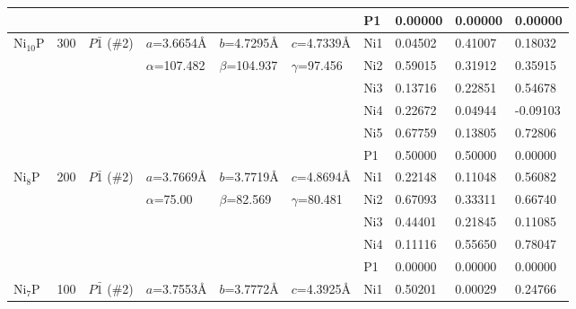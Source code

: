 \documentclass[twoside,twocolumn,9pt]{article}
\begin{document}
\begin{table}[t]
\begin{tabular*}{\textwidth}{@{\extracolsep{\fill}}llllllllll}
               &     &               &                  &                 &                  & P1  & 0.00000  & 0.00000 & 0.00000 \\
\midrule
    Ni$_{10}$P & 300 & $P\bar{1}$ (\#2)     & $a$=3.6654\AA    & $b$=4.7295\AA   & $c$=4.7339\AA    & Ni1 & 0.04502 & 0.41007 & 0.18032 \\
               &     &               & $\alpha$=107.482 & $\beta$=104.937 & $\gamma$=97.456  & Ni2 & 0.59015 & 0.31912 & 0.35915 \\
               &     &               &                  &                 &                  & Ni3 & 0.13716 & 0.22851 & 0.54678 \\
               &     &               &                  &                 &                  & Ni4 & 0.22672 & 0.04944 & -0.09103\\
               &     &               &                  &                 &                  & Ni5 & 0.67759 & 0.13805 & 0.72806 \\
               &     &               &                  &                 &                  & P1  & 0.50000 & 0.50000 & 0.00000 \\
\midrule
    Ni$_{8}$P  & 200 & $P\bar{1}$ (\#2)     & $a$=3.7669\AA    & $b$=3.7719\AA   & $c$=4.8694\AA    & Ni1 & 0.22148 & 0.11048 & 0.56082 \\
               &     &               & $\alpha$=75.00 & $\beta$=82.569 & $\gamma$=80.481     & Ni2 & 0.67093 & 0.33311 & 0.66740 \\
               &     &               &                  &                 &                  & Ni3 & 0.44401 & 0.21845 & 0.11085 \\
               &     &               &                  &                 &                  & Ni4 & 0.11116 & 0.55650 & 0.78047 \\
               &     &               &                  &                 &                  & P1  & 0.00000 & 0.00000 & 0.00000 \\
\midrule
    Ni$_{7}$P  & 100 & $P\bar{1}$ (\#2)     & $a$=3.7553\AA    & $b$=3.7772\AA   & $c$=4.3925\AA    & Ni1 &  0.50201 & 0.00029 & 0.24766 \\

\end{tabular*}
\end{table}
\end{document}
